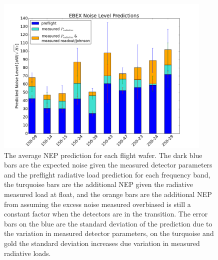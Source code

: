 \documentclass[../EBEXPaper2.tex]{subfiles}
\begin{document}
\begin{figure}[ht!]
\begin{center}
\includegraphics[height=3in]{images/ebex_noise_level_predictions_barchart_per_wafer}
\caption{The average \ac{NEP} prediction for each flight wafer. The dark blue bars are the expected noise given the measured detector parameters and the preflight radiative load prediction for each frequency band, the turquoise bars are the additional \ac{NEP} given the radiative measured load at float, and the orange bars are the additional \ac{NEP} from assuming the excess noise measured overbiased is still a constant factor when the detectors are in the transition. The error bars on the blue are the standard deviation of the prediction due to the variation in measured detector parameters, on the turquoise and gold the standard deviation increases due variation in measured radiative loads. }
\label{fig:nep_prediction_barchart}
\end{center}
\end{figure}
\end{document}
